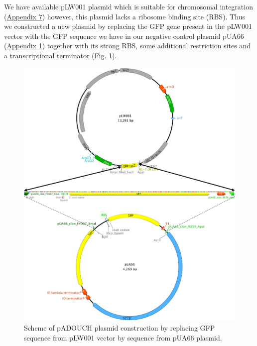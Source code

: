We have available pLW001 plasmid which is suitable for chromosomal integration (\hyperlink{pLW001}{Appendix 7}) however, this plasmid lacks a ribosome binding site (RBS).
Thus we constructed a new plasmid by replacing the GFP gene present in the pLW001 vector with the GFP sequence we have in our negative control plasmid pUA66 (\hyperlink{pUA66seq}{Appendix 1}) together with its strong RBS, some additional restriction sites and a transcriptional terminator (Fig. \ref{cloning}).
\begin{figure}[ht!]
  \centering
  \includegraphics[scale=0.41]{text/Pictures/Cloning.png}
    \caption{Scheme of pADOUCH plasmid construction by replacing GFP sequence from pLW001 vector by sequence from pUA66 plasmid.}
    \label{cloning}
\end{figure}

